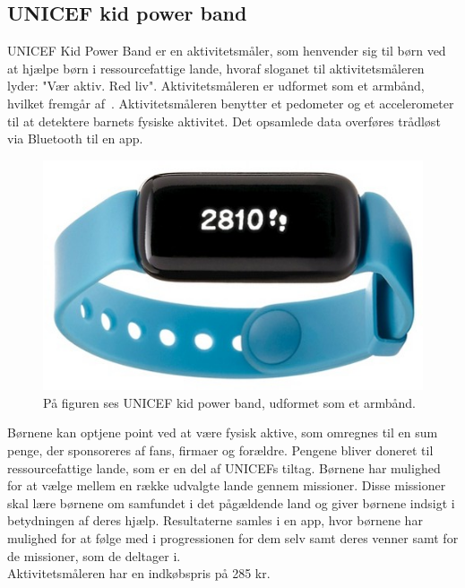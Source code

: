 \subsection{UNICEF kid power band}
UNICEF Kid Power Band er en aktivitetsmåler, som henvender sig til børn ved at hjælpe børn i ressourcefattige lande, hvoraf sloganet til aktivitetsmåleren lyder: "Vær aktiv. Red liv". Aktivitetsmåleren er udformet som et armbånd, hvilket fremgår af~. Aktivitetsmåleren benytter et pedometer og et accelerometer til at detektere barnets fysiske aktivitet. Det opsamlede data overføres trådløst via Bluetooth til en app. \citep{PowerAbout2015,PowerManual2015}
\begin{figure}[H]
	\centering
	\includegraphics[scale=0.32]{figures/aProblemanalyse/unicef.png}
	\caption{På figuren ses UNICEF kid power band, udformet som et armbånd. \cite{Unicef2016}}
	\label{fig:unicef}
\end{figure}\vspace{-.25cm}
Børnene kan optjene point ved at være fysisk aktive, som omregnes til en sum penge, der sponsoreres af fans, firmaer og forældre. Pengene bliver doneret til ressourcefattige lande, som er en del af UNICEFs tiltag. 
Børnene har mulighed for at vælge mellem en række udvalgte lande gennem missioner. Disse missioner skal lære børnene om samfundet i det pågældende land og giver børnene indsigt i betydningen af deres hjælp. Resultaterne samles i en app, hvor børnene har mulighed for at følge med i progressionen for dem selv samt deres venner samt for de missioner, som de deltager i.~\citep{PowerAbout2015,PowerManual2015}\\
Aktivitetsmåleren har en indkøbspris på 285 kr. \citep{Unicef2016}

